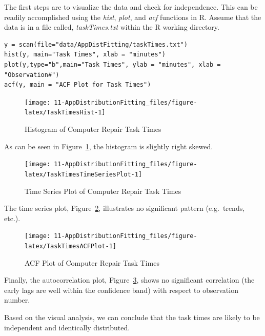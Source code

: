 \documentclass[
]{book}
\theoremstyle{definition}
\theoremstyle{definition}
\theoremstyle{definition}
\theoremstyle{definition}
\theoremstyle{remark}
\begin{document}
The first steps are to visualize the data and check for independence.
This can be readily accomplished using the \emph{hist}, \emph{plot}, and \emph{acf}
functions in R. Assume that the data is in a file called,
\emph{taskTimes.txt} within the R working directory.

\begin{verbatim}
y = scan(file="data/AppDistFitting/taskTimes.txt")
hist(y, main="Task Times", xlab = "minutes")
plot(y,type="b",main="Task Times", ylab = "minutes", xlab = "Observation#")
acf(y, main = "ACF Plot for Task Times")
\end{verbatim}

\begin{figure}

{\centering \texttt{[image: 11-AppDistributionFitting\_files/figure-latex/TaskTimesHist-1]} 

}

\caption{Histogram of Computer Repair Task Times}\label{fig:TaskTimesHist}
\end{figure}

As can be seen in Figure~\ref{fig:TaskTimesHist}, the histogram is slightly right skewed.

\begin{figure}

{\centering \texttt{[image: 11-AppDistributionFitting\_files/figure-latex/TaskTimesTimeSeriesPlot-1]} 

}

\caption{Time Series Plot of Computer Repair Task Times}\label{fig:TaskTimesTimeSeriesPlot}
\end{figure}

The time series plot, Figure~\ref{fig:TaskTimesTimeSeriesPlot}, illustrates no significant
pattern (e.g.~trends, etc.).

\begin{figure}

{\centering \texttt{[image: 11-AppDistributionFitting\_files/figure-latex/TaskTimesACFPlot-1]} 

}

\caption{ACF Plot of Computer Repair Task Times}\label{fig:TaskTimesACFPlot}
\end{figure}

Finally, the autocorrelation plot, Figure~\ref{fig:TaskTimesACFPlot}, shows no significant correlation (the early lags are well within the confidence band) with respect to observation
number.

Based on the visual analysis, we can conclude that the task times are
likely to be independent and identically distributed.
\end{document}
